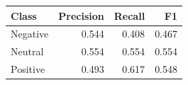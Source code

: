 \begin{tabular}{lrrr}
\toprule
Class & Precision & Recall & F1\\
\midrule
Negative & 0.544 & 0.408 & 0.467 \\
Neutral & 0.554 & 0.554 & 0.554 \\
Positive & 0.493 & 0.617 & 0.548 \\
\bottomrule
\end{tabular}
